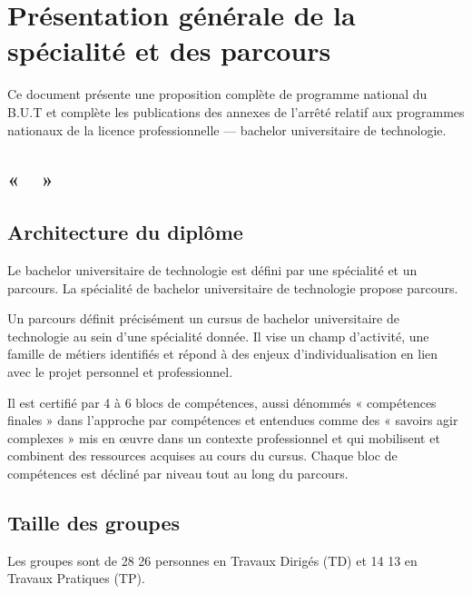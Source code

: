 \documentclass[10pt]{article}
\begin{document}
\newpage
\section[Présentation générale]{Présentation générale de la spécialité et des parcours}
Ce document présente une proposition complète de programme national du
B.U.T  et complète les publications des annexes de
l'arrêté relatif aux programmes nationaux de la licence professionnelle
— bachelor universitaire de technologie.



\subsection*{ «~~»}

\subsection[Architecture du diplôme]{Architecture du diplôme}
Le bachelor universitaire de technologie est défini par une spécialité
et un parcours. La spécialité  de bachelor
universitaire de technologie propose 
parcours.

Un parcours définit précisément un cursus de bachelor universitaire de technologie au sein d’une
spécialité donnée. Il vise un champ d’activité, une famille de métiers identifiés et répond à des
enjeux d’individualisation en lien avec le projet personnel et professionnel.

Il est certifié par 4 à 6 blocs de compétences, aussi dénommés « compétences finales » dans
l’approche par compétences et entendues comme des « savoirs agir complexes » mis en œuvre
dans un contexte professionnel et qui mobilisent et combinent des ressources acquises au cours du
cursus. Chaque bloc de compétences est décliné par niveau tout au long du parcours.

\subsection{Taille des groupes}
Les groupes sont de
28
26
personnes en Travaux Dirigés (TD) et
14
13
en Travaux Pratiques (TP).
\end{document}
